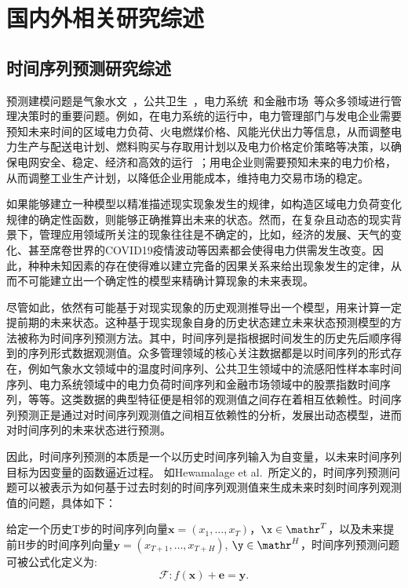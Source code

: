 \chapter[国内外相关研究综述]{国内外相关研究综述}

\section{时间序列预测研究综述}
预测建模问题是气象水文~\cite{mudelseeTrend2019}，公共卫生~\cite{chimmulaTime2020}，电力系统~\cite{qiuEmpirical2017}和金融市场~\cite{niuDeveloping2020}等众多领域进行管理决策时的重要问题。例如，在电力系统的运行中，电力管理部门与发电企业需要预知未来时间的区域电力负荷、火电燃煤价格、风能光伏出力等信息，从而调整电力生产与配送电计划、燃料购买与存取用计划以及电力价格定价策略等决策，以确保电网安全、稳定、经济和高效的运行~\cite{hu2015jiyu}；用电企业则需要预知未来的电力价格，从而调整工业生产计划，以降低企业用能成本，维持电力交易市场的稳定\cite{hongEnergy2020}。

如果能够建立一种模型以精准描述现实现象发生的规律，如构造区域电力负荷变化规律的确定性函数，则能够正确推算出未来的状态。然而，在复杂且动态的现实背景下，管理应用领域所关注的现象往往是不确定的，比如，经济的发展、天气的变化、甚至席卷世界的COVID19疫情波动等因素都会使得电力供需发生改变\cite{heHybrid2019,liuPower2022,obstAdaptive2021}。因此，种种未知因素的存在使得难以建立完备的因果关系来给出现象发生的定律，从而不可能建立出一个确定性的模型来精确计算现象的未来表现\cite{boxTime2011}。

尽管如此，依然有可能基于对现实现象的历史观测推导出一个模型，用来计算一定提前期的未来状态。这种基于现实现象自身的历史状态建立未来状态预测模型的方法被称为时间序列预测方法。其中，时间序列是指根据时间发生的历史先后顺序得到的序列形式数据观测值。众多管理领域的核心关注数据都是以时间序列的形式存在，例如气象水文领域中的温度时间序列、公共卫生领域中的流感阳性样本率时间序列、电力系统领域中的电力负荷时间序列和金融市场领域中的股票指数时间序列，等等。这类数据的典型特征便是相邻的观测值之间存在着相互依赖性。时间序列预测正是通过对时间序列观测值之间相互依赖性的分析，发展出动态模型，进而对时间序列的未来状态进行预测。

因此，时间序列预测的本质是一个以历史时间序列输入为自变量，以未来时间序列目标为因变量的函数逼近过程。
如Hewamalage et al.~\cite{hewamalageRecurrent2021}所定义的，时间序列预测问题可以被表示为如何基于过去时刻的时间序列观测值来生成未来时刻时间序列观测值的问题，具体如下：

给定一个历史T步的时间序列向量$\bm{x} = (x_1, \ldots, x_T)$，\(\x \in \mathr^{T}\)，以及未来提前H步的时间序列向量$\bm{y} = (x_{T+1},\ldots,x_{T+H})$, \(\y \in \mathr^{H}\)，时间序列预测问题可被公式化定义为:
\begin{equation}
    \mathcal{F} : f(\bm x) + \bm e = \bm y. \label{eq:sec.intro.def}
\end{equation}

